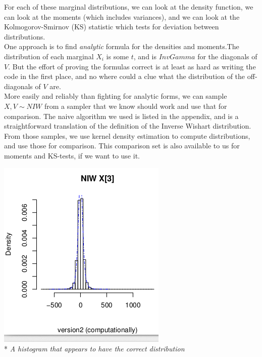 \documentclass[english]{report}
\begin{document}
For each of these marginal distributions, we can look at the density function, we can look at the moments (which includes variances), and we can look at the Kolmogorov-Smirnov (KS) statistic which tests for deviation between distributions.\\

One approach is to find \emph{analytic} formula for the densities and moments.The distribution of each marginal $X_i$ is \cite{Bayes} some $t$, and is $InvGamma$ \cite{Wikipedia2} for the diagonals of $V$. But the effort of proving the formulas correct is at least as hard as writing the code in the first place, and no where could a clue what the distribution of the off-diagonals of $V$ are.\\

More easily and reliably than fighting for analytic forms, we can sample $X,V \sim NIW$ from a sampler that we know should work and use that for comparison.
The naive algorithm we used is listed in the appendix, and is a straightforward translation of the definition of the Inverse Wishart distribution.
From those samples, we use kernel density estimation to compute distributions, and use those for comparison. This comparison set is also available to us for moments and KS-tests, if we want to use it.

\begin{center}
\includegraphics[scale=.8]{densitycorrect.png}\\*
\emph{A histogram that appears to have the correct distribution}
\end{center}
\end{document}

